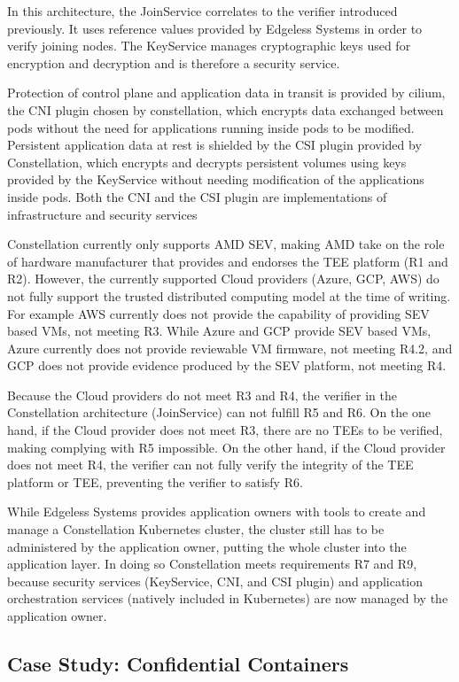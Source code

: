 In this architecture, the JoinService correlates to the verifier introduced
previously. It uses reference values provided by Edgeless Systems in order to
verify joining nodes. The KeyService manages cryptographic keys used for
encryption and decryption and is therefore a security service.

Protection of control plane and application data in transit is provided by
cilium, the CNI plugin chosen by constellation, which encrypts data exchanged
between pods without the need for applications running inside pods to be
modified. Persistent application data at rest is shielded by the CSI plugin
provided by Constellation, which encrypts and decrypts persistent volumes using
keys provided by the KeyService without needing modification of the applications
inside pods. Both the CNI and the CSI plugin are implementations of
infrastructure and security services

Constellation currently only supports AMD SEV, making AMD take on the role of
hardware manufacturer that provides and endorses the TEE platform (R1 and R2).
However, the currently supported Cloud providers (Azure, GCP, AWS) do not fully
support the trusted distributed computing model at the time of writing. For
example AWS currently does not provide the capability of providing SEV based
VMs, not meeting R3. While Azure and GCP provide SEV based VMs, Azure currently
does not provide reviewable VM firmware, not meeting R4.2, and GCP does not
provide evidence produced by the SEV platform, not meeting R4.

Because the Cloud providers do not meet R3 and R4, the verifier in the
Constellation architecture (JoinService) can not fulfill R5 and R6. On the one
hand, if the Cloud provider does not meet R3, there are no TEEs to be verified,
making complying with R5 impossible. On the other hand, if the Cloud provider
does not meet R4, the verifier can not fully verify the integrity of the TEE
platform or TEE, preventing the verifier to satisfy R6.

While Edgeless Systems provides application owners with tools to create and
manage a Constellation Kubernetes cluster, the cluster still has to be
administered by the application owner, putting the whole cluster into the
application layer. In doing so Constellation meets requirements R7 and R9,
because security services (KeyService, CNI, and CSI plugin) and application
orchestration services (natively included in Kubernetes) are now managed by the
application owner.

\subsection{Case Study: Confidential Containers}

